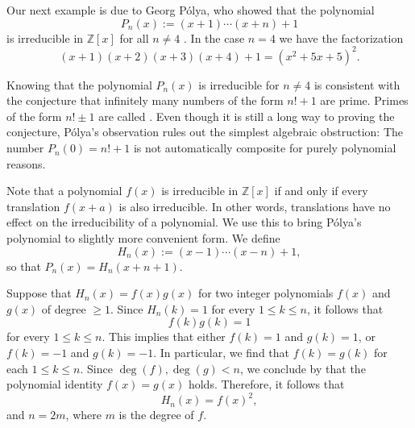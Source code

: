 \begin{example}
  Our next example is due to Georg P\'{o}lya, who showed that the polynomial
  \begin{equation*}
    P_n(x):=(x+1)\cdots (x+n)+1
  \end{equation*}
  is irreducible in $\mathbb{Z}[x]$ for all $n\neq 4$ \cite{polya1919}. In the case $n=4$ we have the factorization
  \begin{equation*}
    (x+1)(x+2)(x+3)(x+4)+1=(x^2+5x+5)^2.
  \end{equation*}
  
  Knowing that the polynomial $P_n(x)$ is irreducible for $n\neq 4$ is consistent with the conjecture that infinitely many numbers of the form $n!+1$ are prime. Primes of the form $n!\pm 1$ are called . Even though it is still a long way to proving the conjecture, P\'{o}lya's observation rules out the simplest algebraic obstruction: The number $P_n(0)=n!+1$ is not automatically composite for purely polynomial reasons.

  Note that a polynomial $f(x)$ is irreducible in $\mathbb{Z}[x]$ if and only if every translation $f(x+a)$ is also irreducible. In other words, translations have no effect on the irreducibility of a polynomial. We use this to bring P\'{o}lya's polynomial to slightly more convenient form. We define
  \begin{equation*}
    H_n(x):=(x-1)\cdots (x-n)+1,
  \end{equation*}
  so that $P_n(x)=H_n(x+n+1)$.

  Suppose that $H_n(x)=f(x)g(x)$ for two integer polynomials $f(x)$ and $g(x)$ of degree $\geq 1$. Since $H_n(k)=1$ for every $1\leq k\leq n$, it follows that
  \begin{equation*}
    f(k)g(k)=1
  \end{equation*}
  for every $1\leq k\leq n$. This implies that either $f(k)=1$ and $g(k)=1$, or $f(k)=-1$ and $g(k)=-1$. In particular, we find that $f(k)=g(k)$ for each $1\leq k\leq n$. Since $\deg(f),\deg(g)<n$, we conclude by  that the polynomial identity $f(x)=g(x)$ holds. Therefore, it follows that
  \begin{equation*}
    H_n(x)=f(x)^2,
  \end{equation*}
  and $n=2m$, where $m$ is the degree of $f$.


\end{example}
